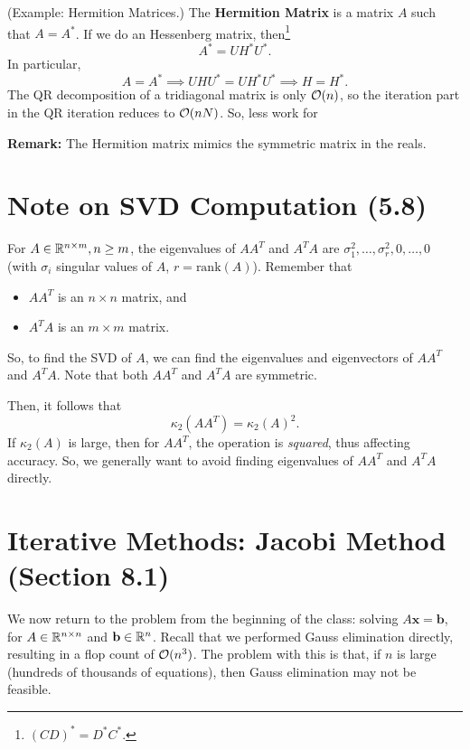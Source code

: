 \documentclass[letterpaper]{article}
\newcommand{\0}{\mathbf{0}}
\renewcommand{\b}{\mathbf{b}}
\newcommand{\x}{\mathbf{x}}
\begin{document}
\begin{mdframed}
    (Example: Hermition Matrices.) The \textbf{Hermition Matrix} is a matrix $A$ such that $A = A^*$. If we do an Hessenberg matrix, then\footnote{$(CD)^* = D^* C^*$.} \[A^* = UH^* U^*.\] In particular, 
    \[A = A^* \implies UHU^* = UH^* U^* \implies H = H^*.\] 
    The QR decomposition of a tridiagonal matrix is only $\mathcal{O}(n)$, so the iteration part in the QR iteration reduces to $\mathcal{O}(nN)$. So, less work for %
\end{mdframed}
\textbf{Remark:} The Hermition matrix mimics the symmetric matrix in the reals.

\section{Note on SVD Computation (5.8)}
For $A \in \mathbb{R}^{n \times m}, n \geq m$, the eigenvalues of $AA^T$ and $A^T A$ are $\sigma_1^2, \hdots, \sigma_r^2, 0, \hdots, 0$ (with $\sigma_i$ singular values of $A$, $r = \text{rank}(A)$). Remember that 
\begin{itemize}
    \item $AA^T$ is an $n \times n$ matrix, and 
    \item $A^T A$ is an $m \times m$ matrix.
\end{itemize}
So, to find the SVD of $A$, we can find the eigenvalues and eigenvectors of $AA^T$ and $A^T A$. Note that both $AA^T$ and $A^T A$ are symmetric. 

\bigskip 

Then, it follows that \[\kappa_{2}(AA^T) = \kappa_{2}(A)^2.\] If $\kappa_{2}(A)$ is large, then for $AA^T$, the operation is \emph{squared}, thus affecting accuracy. So, we generally want to avoid finding eigenvalues of $AA^T$ and $A^T A$ directly.




\section{Iterative Methods: Jacobi Method (Section 8.1)}
We now return to the problem from the beginning of the class: solving $A\x = \b$, for $A \in \mathbb{R}^{n \times n}$ and $\b \in \R^n$. Recall that we performed Gauss elimination directly, resulting in a flop count of $\mathcal{O}(n^3)$. The problem with this is that, if $n$ is large (hundreds of thousands of equations), then Gauss elimination may not be feasible. 

\bigskip 
\end{document}
